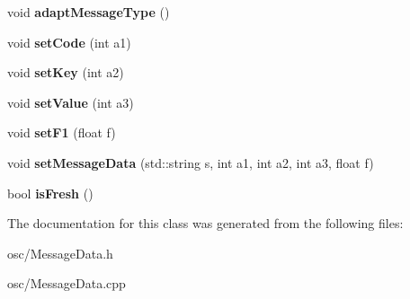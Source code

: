 \begin{DoxyCompactItemize}
\item 
void {\bfseries adapt\+Message\+Type} ()\hypertarget{classosc_1_1MessageData_a0f8ce5f6d5c4452e26656236ee7aefc3}{}\label{classosc_1_1MessageData_a0f8ce5f6d5c4452e26656236ee7aefc3}

\item 
void {\bfseries set\+Code} (int a1)\hypertarget{classosc_1_1MessageData_a8639583a844208ccae9568bb68d1e547}{}\label{classosc_1_1MessageData_a8639583a844208ccae9568bb68d1e547}

\item 
void {\bfseries set\+Key} (int a2)\hypertarget{classosc_1_1MessageData_a54a0ddfb44fba671ba243914b037e231}{}\label{classosc_1_1MessageData_a54a0ddfb44fba671ba243914b037e231}

\item 
void {\bfseries set\+Value} (int a3)\hypertarget{classosc_1_1MessageData_a24e273f0a4443505ccf6222405cfb567}{}\label{classosc_1_1MessageData_a24e273f0a4443505ccf6222405cfb567}

\item 
void {\bfseries set\+F1} (float f)\hypertarget{classosc_1_1MessageData_a94dce06ace95a93c075dbaf253e559fe}{}\label{classosc_1_1MessageData_a94dce06ace95a93c075dbaf253e559fe}

\item 
void {\bfseries set\+Message\+Data} (std\+::string s, int a1, int a2, int a3, float f)\hypertarget{classosc_1_1MessageData_a9eb7741e4216075b0e03c554d83e35ae}{}\label{classosc_1_1MessageData_a9eb7741e4216075b0e03c554d83e35ae}

\item 
bool {\bfseries is\+Fresh} ()\hypertarget{classosc_1_1MessageData_a169f4e7ec5a0eb896cfccd8186b5fe8d}{}\label{classosc_1_1MessageData_a169f4e7ec5a0eb896cfccd8186b5fe8d}

\end{DoxyCompactItemize}


The documentation for this class was generated from the following files\+:\begin{DoxyCompactItemize}
\item 
osc/Message\+Data.\+h\item 
osc/Message\+Data.\+cpp\end{DoxyCompactItemize}
